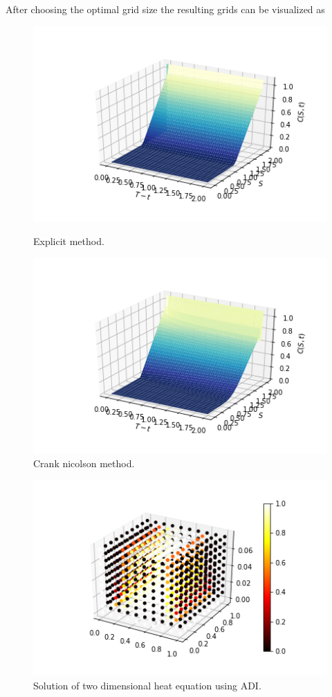 \documentclass[12pt, oneside]{book}
\theoremstyle{plain}
\theoremstyle{definition}
\begin{document}
After choosing the optimal grid size the resulting grids can be visualized as
\begin{figure}[!htb]
  \begin{minipage}[b]{0.5\textwidth}
    \includegraphics[width=\textwidth]{BSExplicitGrid.png}
    \caption{Explicit method.}
  \end{minipage}
  \begin{minipage}[b]{0.5\textwidth}
    \includegraphics[width=\textwidth]{BSCNGrid.png}
    \caption{Crank nicolson method.}
  \end{minipage}
\end{figure}

\begin{figure}[!htb]
    \centering
        \includegraphics[scale=0.6]{ADIHeat.png}
    \caption{Solution of two dimensional heat equation using ADI.}
\end{figure}
\end{document}

